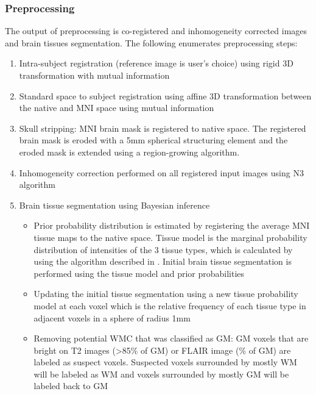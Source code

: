 \subsubsection{Preprocessing}
The output of preprocessing is co-registered and inhomogeneity corrected images and brain tissues segmentation. The following enumerates preprocessing steps:
\begin{enumerate}
\item Intra-subject registration (reference image is user’s choice) using rigid 3D transformation with mutual information
\item Standard space to subject registration using affine 3D transformation between the native and MNI space using mutual information
\item Skull stripping: MNI brain mask is registered to native space. The registered brain mask is eroded with a 5mm spherical structuring element and the eroded mask is extended using a region-growing algorithm.
\item Inhomogeneity correction performed on all registered input images using N3 algorithm \cite{N3}
\item Brain tissue segmentation using Bayesian inference
\begin{itemize}
    \item Prior probability distribution is estimated by registering the average MNI tissue maps to the native space. Tissue model is the marginal probability distribution of intensities of the 3 tissue types, which is calculated by using the algorithm described in \cite{EM_Empirical}. Initial brain tissue segmentation is performed using the tissue model and prior probabilities
    \item Updating the initial tissue segmentation using a new tissue probability model at each voxel which is the relative frequency of each tissue type in adjacent voxels in a sphere of radius 1mm
    \item Removing potential WMC that was classified as GM: GM voxels that are bright on T2 images (>85\% of GM) or FLAIR image (\% of GM) are labeled as suspect voxels. Suspected voxels surrounded by mostly WM will be labeled as WM and voxels surrounded by mostly GM will be labeled back to GM
\end{itemize}
\end{enumerate}
  
  
  
  
  
  
  
  
  